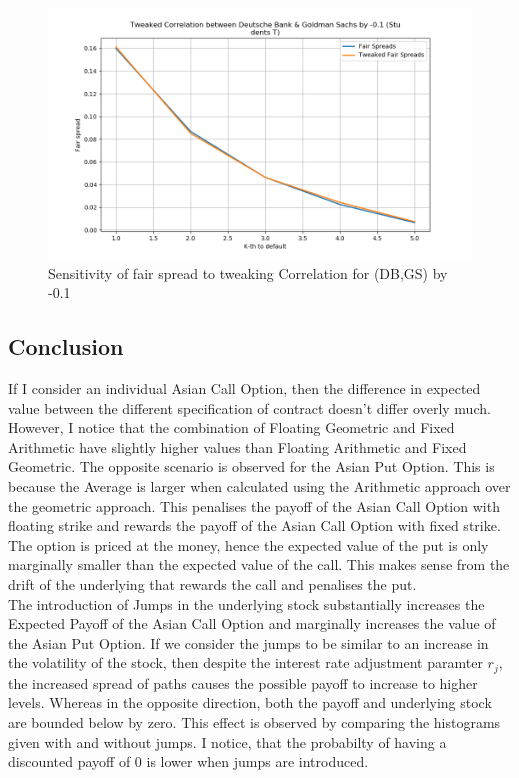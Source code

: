 \documentclass{report}
\theoremstyle{plain}
\theoremstyle{definition}
\begin{document}
\begin{figure}[H]
	\begin{center}
		\includegraphics[width=15cm]{Tweaked_Correlation_between_Deutsche_Bank_&_Goldman_Sachs_by_-0,1_(Students_T)}
		\caption{Sensitivity of fair spread to tweaking Correlation for (DB,GS) by -0.1} 
		\label{Tweaked_Correlation_between_Deutsche_Bank_&_Goldman_Sachs_by_-0.1_(Students_T)}
	\end{center}
\end{figure}

\subsection*{Conclusion}

If I consider an individual Asian Call Option, then the difference in expected value between the different specification of contract doesn't differ overly much. However, I notice that the combination of Floating Geometric and Fixed Arithmetic have slightly higher values than Floating Arithmetic and Fixed Geometric. The opposite scenario is observed for the Asian Put Option. This is because the Average is larger when calculated using the Arithmetic approach over the geometric approach. This penalises the payoff of the Asian Call Option with floating strike and rewards the payoff of the Asian Call Option with fixed strike.\newline
\\
The option is priced at the money, hence the expected value of the put is only marginally smaller than the expected value of the call. This makes sense from the drift of the underlying that rewards the call and penalises the put.\newline
\\
The introduction of Jumps in the underlying stock substantially increases the Expected Payoff of the Asian Call Option and marginally increases the value of the Asian Put Option. If we consider the jumps to be similar to an increase in the volatility of the stock, then despite the interest rate adjustment paramter $r_j$, the increased spread of paths causes the possible payoff to increase to higher levels. Whereas in the opposite direction, both the payoff and underlying stock are bounded below by zero. This effect is observed  by comparing the histograms given with and without jumps. I notice, that the probabilty of having a discounted payoff of 0 is lower when jumps are introduced.
\end{document}
